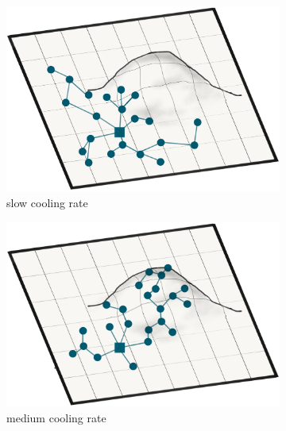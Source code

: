 \begin{figure}[!htbp]
 \centering
    \begin{subfigure}[b]{0.5\textwidth}
        \centering
    	\includegraphics[width=\textwidth]{img/slow_cooling.png}
        \caption{slow cooling rate}
        \label{subfig:slow_cooling}
    \end{subfigure}%
    \hfill
    \begin{subfigure}[b]{0.5\textwidth}
        \centering
        \includegraphics[width=\textwidth]{img/medium_cooling.png}
        \caption{medium cooling rate}
        \label{subfig:slow_cooling}
    \end{subfigure}
    \hfill
    \begin{subfigure}[b]{0.5\textwidth}
        \centering

\end{subfigure}
\end{figure}
